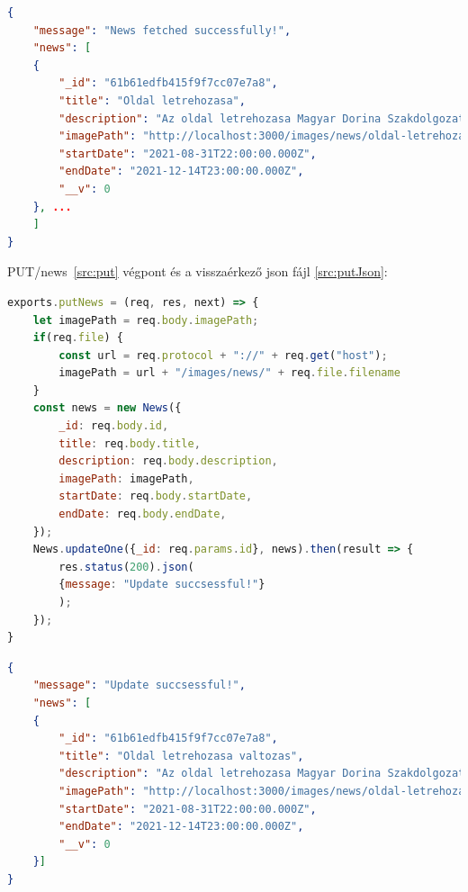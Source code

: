 \begin{lstlisting}[language={JSON}]
{
	"message": "News fetched successfully!",
	"news": [
	{
		"_id": "61b61edfb415f9f7cc07e7a8",
		"title": "Oldal letrehozasa",
		"description": "Az oldal letrehozasa Magyar Dorina Szakdolgozata elkeszitese celjabol tortent. Jelenleg ez az oldal nem uzemel! Nem kerulnek ertekesitesre azok a termekek, amik az aruhazban talalhatoak! Ha tovabbi kerdese lenne a Rolunk feliratu menun keresztul kapcsolatba lephet velem es minden kerdesre email formajaban valaszolok. Megerteseteket elore is koszonom!",
		"imagePath": "http://localhost:3000/images/news/oldal-letrehozasa-1639325407045.png",
		"startDate": "2021-08-31T22:00:00.000Z",
		"endDate": "2021-12-14T23:00:00.000Z",
		"__v": 0
	}, ...
	]
}
\end{lstlisting}

PUT/news~\ref{src:put} végpont és a visszaérkező json fájl \ref{src:putJson}:

\begin{lstlisting}[language=JavaScript]
exports.putNews = (req, res, next) => {
	let imagePath = req.body.imagePath;
	if(req.file) {
		const url = req.protocol + "://" + req.get("host");
		imagePath = url + "/images/news/" + req.file.filename
	}
	const news = new News({
		_id: req.body.id,
		title: req.body.title,
		description: req.body.description,
		imagePath: imagePath,
		startDate: req.body.startDate,
		endDate: req.body.endDate,
	});
	News.updateOne({_id: req.params.id}, news).then(result => {
		res.status(200).json(
		{message: "Update succsessful!"}
		);
	});
}
\end{lstlisting}

\begin{lstlisting}[language={JSON}]
{
	"message": "Update succsessful!",
	"news": [
	{
		"_id": "61b61edfb415f9f7cc07e7a8",
		"title": "Oldal letrehozasa valtozas",
		"description": "Az oldal letrehozasa Magyar Dorina Szakdolgozata elkeszitese celjabol tortent. Jelenleg ez az oldal nem uzemel! Nem kerulnek ertekesitesre azok a termekek, amik az aruhazban talalhatoak! Ha tovabbi kerdese lenne a Rolunk feliratu menun keresztul kapcsolatba lephet velem es minden kerdesre email formajaban valaszolok. Megerteseteket elore is koszonom!",
		"imagePath": "http://localhost:3000/images/news/oldal-letrehozasa-1639325407045.png",
		"startDate": "2021-08-31T22:00:00.000Z",
		"endDate": "2021-12-14T23:00:00.000Z",
		"__v": 0
	}]
}
\end{lstlisting}

